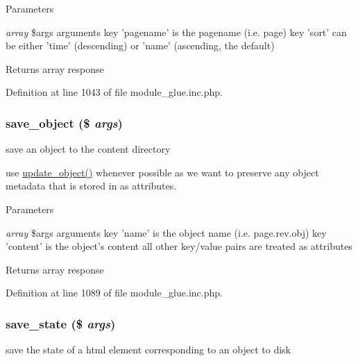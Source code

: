 \begin{DoxyParams}{Parameters}
\item[{\em array}]\$args arguments key 'pagename' is the pagename (i.e. page) key 'sort' can be either 'time' (descending) or 'name' (ascending, the default) \end{DoxyParams}
\begin{DoxyReturn}{Returns}
array response 
\end{DoxyReturn}


Definition at line 1043 of file module\_\-glue.inc.php.

\hypertarget{module__glue_8inc_8php_ab294f21c7f6fed0932b65167f180c78c}{
\subsubsection[{save\_\-object}]{\setlength{\rightskip}{0pt plus 5cm}save\_\-object (\$ {\em args})}}
\label{module__glue_8inc_8php_ab294f21c7f6fed0932b65167f180c78c}
save an object to the content directory

use \hyperlink{module__glue_8inc_8php_a4aed316adcde13b40c9fc1b35e6537a4}{update\_\-object()} whenever possible as we want to preserve any object metadata that is stored in as attributes. 
\begin{DoxyParams}{Parameters}
\item[{\em array}]\$args arguments key 'name' is the object name (i.e. page.rev.obj) key 'content' is the object's content all other key/value pairs are treated as attributes \end{DoxyParams}
\begin{DoxyReturn}{Returns}
array response 
\end{DoxyReturn}


Definition at line 1089 of file module\_\-glue.inc.php.

\hypertarget{module__glue_8inc_8php_a60d03d7a0d8783e926835f0aa6cff698}{
\subsubsection[{save\_\-state}]{\setlength{\rightskip}{0pt plus 5cm}save\_\-state (\$ {\em args})}}
\label{module__glue_8inc_8php_a60d03d7a0d8783e926835f0aa6cff698}
save the state of a html element corresponding to an object to disk

